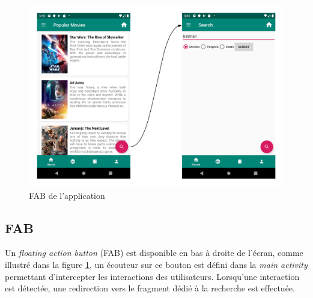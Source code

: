 \begin{figure}
    \begin{center}
        \includegraphics[width=1\textwidth]{img/screenshots/FAB.png}
    \end{center}
    \caption{FAB de l'application}
    \label{fab}
\end{figure}

\subsection{FAB}
Un \textit{floating action button} (FAB) est disponible en bas à droite de l'écran, comme illustré dans la figure \ref{fab}, un écouteur sur ce bouton est défini dans la \textit{main activity} permettant d'intercepter les interactions des utilisateurs. Lorsqu'une interaction est détectée, une redirection vers le fragment dédié à la recherche est effectuée.

